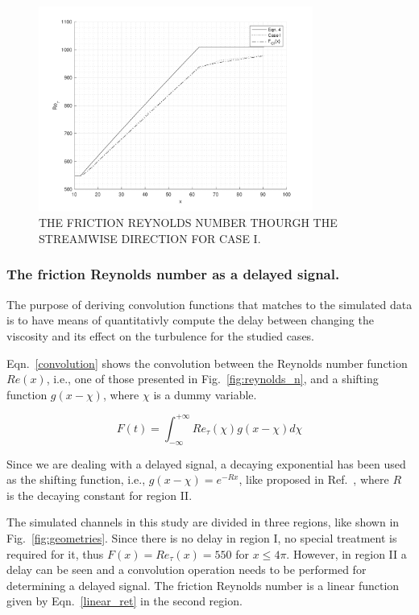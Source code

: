 \documentclass[twocolumn,10pt]{asme2e}
\begin{document}
\begin{figure}[!htbp]
\begin{center}
\setlength{\unitlength}{0.012500in}%
  \includegraphics[trim = 20mm 15mm 20mm 10mm, width = 90mm]{Re_t_CI.png}
\end{center}
  \caption{THE FRICTION REYNOLDS NUMBER THOURGH THE STREAMWISE DIRECTION FOR CASE I.}
  \label{fig:re_t_x}
\end{figure}

\subsubsection*{The friction Reynolds number as a delayed signal.} 

The purpose of deriving convolution functions that matches to the simulated data is to have means of quantitativly compute the delay between changing the viscosity and its effect on the turbulence for the studied cases.

Eqn.~\ref{convolution} shows the convolution between the Reynolds number function \(Re(x)\), i.e., one of those presented in Fig.~\ref{fig:reynolds_n}, and a shifting function \(g(x-\chi)\), where \(\chi\) is a dummy variable.

\begin{equation}
F(t) =  \int_{-\infty}^{+\infty} Re_{\tau}(\chi)g(x-\chi)d\chi
\label{convolution}
\end{equation}

Since we are dealing with a delayed signal, a decaying exponential has been used as the shifting function, i.e., \(g(x-\chi)=e^{-Rx}\), like proposed in Ref.~\cite{signals}, where \(R\) is the decaying constant for region II.

The simulated channels in this study are divided in three regions, like shown in Fig.~\ref{fig:geometries}. Since there is no delay in region I, no special treatment is required for it, thus \(F(x)=Re_{\tau}(x)=550\) for \(x{\leq}4\pi\). However, in region II a delay can be seen and a convolution operation needs to be performed for determining a delayed signal. The friction Reynolds number is a linear function given by Eqn.~\ref{linear_ret} in the second region.
\end{document}
